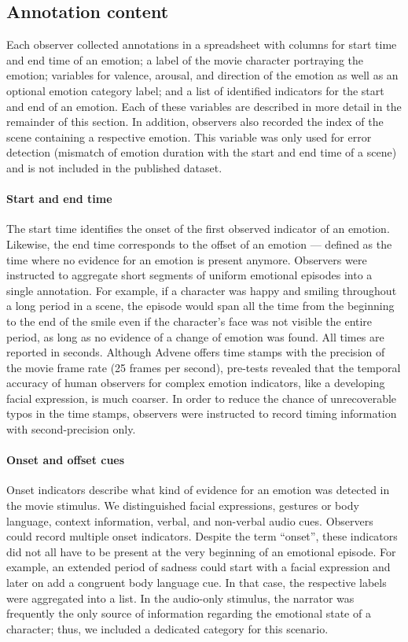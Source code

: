 \documentclass[10pt,a4paper,twocolumn]{article}
\begin{document}
\subsection*{Annotation content}

Each observer collected annotations in a spreadsheet with columns
for start time and end time of an emotion; a label of the movie character
portraying the emotion; variables for valence, arousal, and direction of the
emotion as well as an optional emotion category label; and a list of
identified indicators for the start and end of an emotion. Each of these
variables are described in more detail in the remainder of this section. In
addition, observers also recorded the index of the scene containing a
respective emotion. This variable was only used for error detection (mismatch
of emotion duration with the start and end time of a scene) and is not included
in the published dataset.

\paragraph{Start and end time}

The start time identifies the onset of the first observed indicator of an
emotion. Likewise, the end time corresponds to the offset of an emotion ---
defined as the time where no evidence for an emotion is present anymore.
Observers were instructed to aggregate short segments of uniform emotional
episodes into a single annotation. For example, if a character was happy and
smiling throughout a long period in a scene, the episode would span all the
time from the beginning to the end of the smile even if the character's face
was not visible the entire period, as long as no evidence of a change of
emotion was found. All times are reported in seconds. Although Advene offers
time stamps with the precision of the movie frame rate (25 frames per second),
pre-tests revealed that the temporal accuracy of human observers for complex
emotion indicators, like a developing facial expression, is much coarser. In
order to reduce the chance of unrecoverable typos in the time stamps, observers
were instructed to record timing information with second-precision only.

\paragraph{Onset and offset cues}

Onset indicators describe what kind of evidence for an emotion was detected in
the movie stimulus. We distinguished facial expressions, gestures or body
language, context information, verbal, and non-verbal audio cues. Observers
could record multiple onset indicators. Despite the term ``onset'', these
indicators did not all have to be present at the very beginning of an emotional
episode. For example, an extended period of sadness could start with a facial
expression and later on add a congruent body language cue. In that case, the
respective labels were aggregated into a list. In the audio-only stimulus, the
narrator was frequently the only source of information regarding the emotional
state of a character; thus, we included a dedicated category for this scenario.
\end{document}
